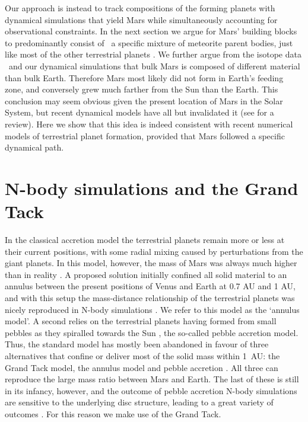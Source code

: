 \documentclass[preprint,5p,times,authoryear]{elsarticle}
\begin{document}
Our approach is instead to track compositions of the forming planets with dynamical simulations that yield Mars while 
simultaneously accounting for observational constraints. In the next section we argue for Mars' building blocks to predominantly 
consist of {\ a specific mixture of meteorite parent bodies, just like most of the other terrestrial planets \citep{War11}. We 
further argue from the isotope data {\ and our dynamical simulations} that bulk Mars is composed of different material than bulk 
Earth.} Therefore Mars most likely did not form in Earth's feeding zone, and conversely grew much farther from the Sun than the Earth. 
This conclusion may seem obvious given the present location of Mars in the Solar System, but recent dynamical models have all but 
invalidated it (see \citet{Morby12} for a review). Here we show that this idea is indeed consistent with recent numerical models of 
terrestrial planet formation, provided that Mars followed a specific dynamical path.

\section{N-body simulations and the Grand Tack}
In the classical accretion model the terrestrial planets remain more or less at their current positions, with some radial mixing 
caused by perturbations from the giant planets. In this model, however, the mass of Mars was always much higher than in reality 
\citep{R09}. A proposed solution initially confined all solid material to an annulus between the present positions of Venus and Earth 
at 0.7 AU and 1 AU, and with this setup the mass-distance relationship of the terrestrial planets was nicely reproduced in N-body 
simulations \citep{H09}. We refer to this model as the ‘annulus model’. A second relies on the terrestrial planets having formed from 
small pebbles as they spiralled towards the Sun \citep{L15}, the so-called pebble accretion model. Thus, the standard model has mostly 
been abandoned in favour of three alternatives that confine or deliver most of the solid mass within 1~AU: the Grand Tack \citep{W11} 
model, the annulus model \citep{H09} and pebble accretion \citep{L15}. All three can reproduce the large mass ratio between Mars and 
Earth. The last of these is still in its infancy, however, and the outcome of pebble accretion N-body simulations are sensitive to the 
underlying disc structure, leading to a great variety of outcomes \citep{I16}. For this reason we make use of the Grand Tack.\\
\end{document}
